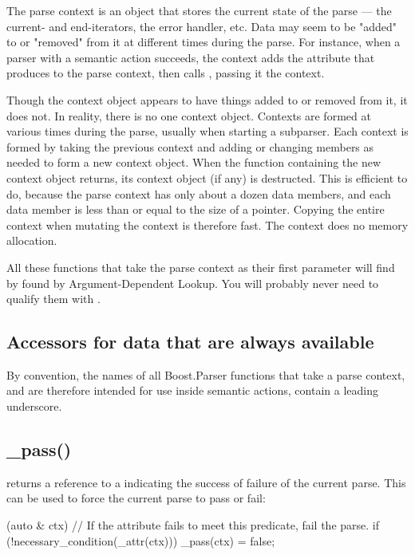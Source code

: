 \documentclass{MyBook}
\begin{document}
The parse context is an object that stores the current state of the parse --- the current- and end-iterators, the error handler, etc. Data may seem to be "added" to or "removed" from it at different times during the parse. For instance, when a parser  with a semantic action  succeeds, the context adds the attribute that  produces to the parse context, then calls , passing it the context.

Though the context object appears to have things added to or removed from it, it does not. In reality, there is no one context object. Contexts are formed at various times during the parse, usually when starting a subparser. Each context is formed by taking the previous context and adding or changing members as needed to form a new context object. When the function containing the new context object returns, its context object (if any) is destructed. This is efficient to do, because the parse context has only about a dozen data members, and each data member is less than or equal to the size of a pointer. Copying the entire context when mutating the context is therefore fast. The context does no memory allocation.

\begin{marker}
All these functions that take the parse context as their first parameter will find by found by Argument-Dependent Lookup. You will probably never need to qualify them with . 
\end{marker}

\subsection{Accessors for data that are always available}

By convention, the names of all Boost.Parser functions that take a parse context, and are therefore intended for use inside semantic actions, contain a leading underscore.

\subsection{\_pass()}

 returns a reference to a  indicating the success of failure of the current parse. This can be used to force the current parse to pass or fail:

\begin{code}
[](auto & ctx) {
    // If the attribute fails to meet this predicate, fail the parse.
    if (!necessary_condition(_attr(ctx)))
        _pass(ctx) = false;
}
\end{code}
\end{document}
